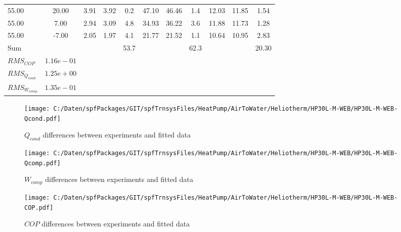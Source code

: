 \documentclass[english]{SPFShortReport}
\begin{document}
\begin{table}[!ht]
\begin{small}
\begin{center}
{\begin{tabular}{l | c c c c c c c c c c }
55.00  & 20.00 & 3.91 & 3.92 & 0.2 & 47.10 & 46.46 & 1.4 & 12.03 & 11.85 & 1.54\\ 
55.00  & 7.00 & 2.94 & 3.09 & 4.8 & 34.93 & 36.22 & 3.6 & 11.88 & 11.73 & 1.28\\ 
55.00  & -7.00 & 2.05 & 1.97 & 4.1 & 21.77 & 21.52 & 1.1 & 10.64 & 10.95 & 2.83\\ 
\hline 
 Sum &  & &  & 53.7 &  &  & 62.3 & &  & 20.30\\ 
\hline 
 $RMS_{COP}$ & $1.16e-01$ \\ 
 $RMS_{Q_{cond}}$ & $1.25e+00$ \\ 
 $RMS_{W_{comp}}$ & $1.35e-01$ \\ 
\hline
\hline
\end{tabular}
}
\label{ErrorsTable}
\end{center}
\end{small}
\end{table}
\begin{figure}[!ht]
\begin{center}
\texttt{[image: C:/Daten/spfPackages/GIT/spfTrnsysFiles/HeatPump/AirToWater/Heliotherm/HP30L-M-WEB/HP30L-M-WEB-Qcond.pdf]}
\caption{$Q_{cond}$ differences between experiments and fitted data}
\label{QcongFig}
\end{center}
\end{figure}
\begin{figure}[!ht]
\begin{center}
\texttt{[image: C:/Daten/spfPackages/GIT/spfTrnsysFiles/HeatPump/AirToWater/Heliotherm/HP30L-M-WEB/HP30L-M-WEB-Qcomp.pdf]}
\caption{$W_{comp}$ differences between experiments and fitted data}
\label{QcompFig}
\end{center}
\end{figure}
\begin{figure}[!ht]
\begin{center}
\texttt{[image: C:/Daten/spfPackages/GIT/spfTrnsysFiles/HeatPump/AirToWater/Heliotherm/HP30L-M-WEB/HP30L-M-WEB-COP.pdf]}
\caption{$COP$ differences between experiments and fitted data}
\label{COPFig}
\end{center}
\end{figure}
\end{document}
